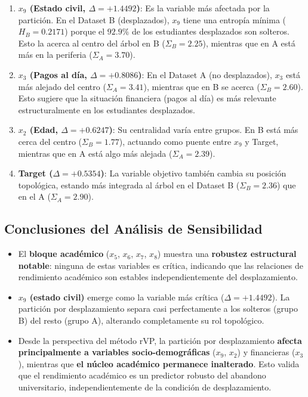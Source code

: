 \documentclass[12pt,a4paper]{article}
\begin{document}
\begin{enumerate}
    \item \textbf{$x_9$ (Estado civil, $\Delta = +1.4492$)}: Es la variable más afectada por la partición. En el Dataset B (desplazados), $x_9$ tiene una entropía mínima ($H_B = 0.2171$) porque el $92.9\%$ de los estudiantes desplazados son solteros. Esto la acerca al centro del árbol en B ($\Sigma_B = 2.25$), mientras que en A está más en la periferia ($\Sigma_A = 3.70$).

    \item \textbf{$x_3$ (Pagos al día, $\Delta = +0.8086$)}: En el Dataset A (no desplazados), $x_3$ está más alejado del centro ($\Sigma_A = 3.41$), mientras que en B se acerca ($\Sigma_B = 2.60$). Esto sugiere que la situación financiera (pagos al día) es más relevante estructuralmente en los estudiantes desplazados.

    \item \textbf{$x_2$ (Edad, $\Delta = +0.6247$)}: Su centralidad varía entre grupos. En B está más cerca del centro ($\Sigma_B = 1.77$), actuando como puente entre $x_9$ y Target, mientras que en A está algo más alejada ($\Sigma_A = 2.39$).

    \item \textbf{Target ($\Delta = +0.5354$)}: La variable objetivo también cambia su posición topológica, estando más integrada al árbol en el Dataset B ($\Sigma_B = 2.36$) que en el A ($\Sigma_A = 2.90$).
\end{enumerate}

\subsection{Conclusiones del Análisis de Sensibilidad}

\begin{itemize}
    \item El \textbf{bloque académico} ($x_5$, $x_6$, $x_7$, $x_8$) muestra una \textbf{robustez estructural notable}: ninguna de estas variables es crítica, indicando que las relaciones de rendimiento académico son estables independientemente del desplazamiento.

    \item \textbf{$x_9$ (estado civil)} emerge como la variable más crítica ($\Delta = +1.4492$). La partición por desplazamiento separa casi perfectamente a los solteros (grupo B) del resto (grupo A), alterando completamente su rol topológico.

    \item Desde la perspectiva del método rVP, la partición por desplazamiento \textbf{afecta principalmente a variables socio-demográficas} ($x_9$, $x_2$) y financieras ($x_3$), mientras que \textbf{el núcleo académico permanece inalterado}. Esto valida que el rendimiento académico es un predictor robusto del abandono universitario, independientemente de la condición de desplazamiento.
\end{itemize}
\end{document}
